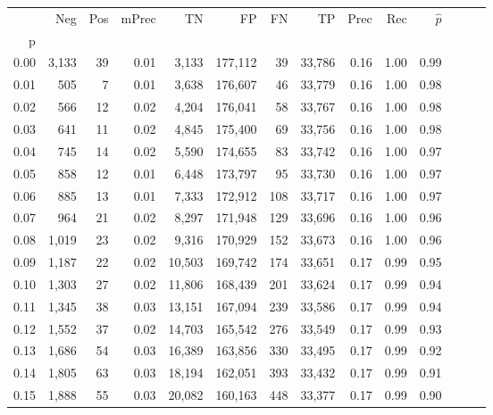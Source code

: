 \begin{tabular}{rrrrrrrrrrrrrr}
\toprule
{} &    Neg &  Pos & mPrec &       TN &       FP &      FN &      TP &  Prec &   Rec & $\hat{p}$ \\
p    &        &      &       &          &          &         &         &       &       &           \\
\midrule
0.00 &  3,133 &   39 &  0.01 &    3,133 &  177,112 &      39 &  33,786 &  0.16 &  1.00 &      0.99 \\
0.01 &    505 &    7 &  0.01 &    3,638 &  176,607 &      46 &  33,779 &  0.16 &  1.00 &      0.98 \\
0.02 &    566 &   12 &  0.02 &    4,204 &  176,041 &      58 &  33,767 &  0.16 &  1.00 &      0.98 \\
0.03 &    641 &   11 &  0.02 &    4,845 &  175,400 &      69 &  33,756 &  0.16 &  1.00 &      0.98 \\
0.04 &    745 &   14 &  0.02 &    5,590 &  174,655 &      83 &  33,742 &  0.16 &  1.00 &      0.97 \\
0.05 &    858 &   12 &  0.01 &    6,448 &  173,797 &      95 &  33,730 &  0.16 &  1.00 &      0.97 \\
0.06 &    885 &   13 &  0.01 &    7,333 &  172,912 &     108 &  33,717 &  0.16 &  1.00 &      0.97 \\
0.07 &    964 &   21 &  0.02 &    8,297 &  171,948 &     129 &  33,696 &  0.16 &  1.00 &      0.96 \\
0.08 &  1,019 &   23 &  0.02 &    9,316 &  170,929 &     152 &  33,673 &  0.16 &  1.00 &      0.96 \\
0.09 &  1,187 &   22 &  0.02 &   10,503 &  169,742 &     174 &  33,651 &  0.17 &  0.99 &      0.95 \\
0.10 &  1,303 &   27 &  0.02 &   11,806 &  168,439 &     201 &  33,624 &  0.17 &  0.99 &      0.94 \\
0.11 &  1,345 &   38 &  0.03 &   13,151 &  167,094 &     239 &  33,586 &  0.17 &  0.99 &      0.94 \\
0.12 &  1,552 &   37 &  0.02 &   14,703 &  165,542 &     276 &  33,549 &  0.17 &  0.99 &      0.93 \\
0.13 &  1,686 &   54 &  0.03 &   16,389 &  163,856 &     330 &  33,495 &  0.17 &  0.99 &      0.92 \\
0.14 &  1,805 &   63 &  0.03 &   18,194 &  162,051 &     393 &  33,432 &  0.17 &  0.99 &      0.91 \\
0.15 &  1,888 &   55 &  0.03 &   20,082 &  160,163 &     448 &  33,377 &  0.17 &  0.99 &      0.90 \\

\end{tabular}
